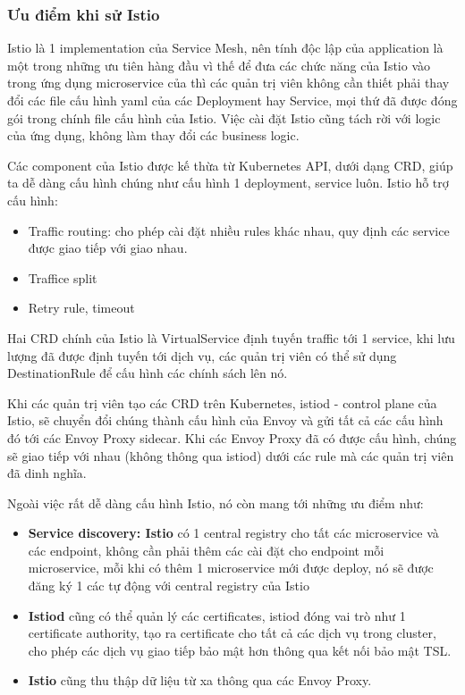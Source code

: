 \documentclass[12pt,a4paper]{report}
\begin{document}
			\subsubsection{Ưu điểm khi sử Istio}
		\hspace{0.6cm}Istio là 1 implementation của Service Mesh, nên tính độc lập của application là một trong những ưu tiên hàng đầu vì thế để đưa các chức năng của Istio vào trong ứng dụng microservice của thì các quản trị viên không cần thiết phải thay đổi các file cấu hình yaml của các Deployment hay Service, mọi thứ đã được đóng gói trong chính file cấu hình của Istio. Việc cài đặt Istio cũng tách rời với logic của ứng dụng, không làm thay đổi các business logic.
		
		Các component của Istio được kế thừa từ Kubernetes API, dưới dạng CRD, giúp ta dễ dàng cấu hình chúng như cấu hình 1 deployment, service luôn. Istio hỗ trợ cấu hình:
		\begin{itemize}
			\item Traffic routing: cho phép cài đặt nhiều rules khác nhau, quy định các service được giao tiếp với giao nhau.
			\item Traffice split
			\item Retry rule, timeout
		\end{itemize}
		
		Hai CRD chính của Istio là VirtualService định tuyến traffic tới 1 service, khi lưu lượng đã được định tuyến tới dịch vụ, các quản trị viên có thể sử dụng DestinationRule để cấu hình các chính sách lên nó.
		
		Khi các quản trị viên tạo các CRD trên Kubernetes, istiod - control plane của Istio, sẽ chuyển đổi chúng thành cấu hình của Envoy và gửi tất cả các cấu hình đó tới các Envoy Proxy sidecar. Khi các Envoy Proxy đã có được cấu hình, chúng sẽ giao tiếp với nhau (không thông qua istiod) dưới các rule mà các quản trị viên đã dinh nghĩa.
		
		Ngoài việc rất dễ dàng cấu hình Istio, nó còn mang tới những ưu điểm như:
		\begin{itemize}
			\item \textbf{Service discovery: Istio} có 1 central registry cho tất các microservice và các endpoint, không cần phải thêm các cài đặt cho endpoint mỗi microservice, mỗi khi có thêm 1 microservice mới được deploy, nó sẽ được đăng ký 1 các tự động với central registry của Istio
			\item \textbf{Istiod} cũng có thể quản lý các certificates, istiod đóng vai trò như 1 certificate authority, tạo ra certificate cho tất cả các dịch vụ trong cluster, cho phép các dịch vụ giao tiếp bảo mật hơn thông qua kết nối bảo mật TSL.
			\item \textbf{Istio} cũng thu thập dữ liệu từ xa thông qua các Envoy Proxy.
		\end{itemize}
		
\end{document}

